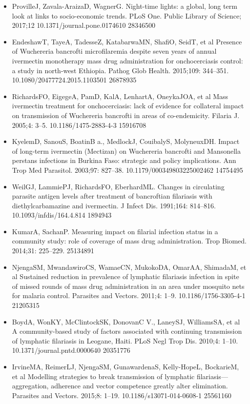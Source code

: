 \documentclass[11pt,a4paper]{article}
\begin{document}
\begin{itemize}
\item ProvilleJ, Zavala-AraizaD, WagnerG. Night-time lights: a global, long term look at links to socio-economic trends. PLoS One. Public Library of Science; 2017;12 10.1371/journal.pone.0174610 28346500
\item EndeshawT, TayeA, TadesseZ, KatabarwaMN, ShafiO, SeidT, et al Presence of Wuchereria bancrofti microfilaremia despite seven years of annual ivermectin monotherapy mass drug administration for onchocerciasis control: a study in north-west Ethiopia. Pathog Glob Health. 2015;109: 344–351. 10.1080/20477724.2015.1103501 26878935
\item RichardsFO, EigegeA, PamD, KalA, LenhartA, OneykaJOA, et al Mass ivermectin treatment for onchocerciasis: lack of evidence for collateral impact on transmission of Wuchereria bancrofti in areas of co-endemicity. Filaria J. 2005;4: 3–5. 10.1186/1475-2883-4-3 15916708
\item KyelemD, SanouS, BoatinB a., MedlockJ, CouibalyS, MolyneuxDH. Impact of long-term ivermectin (Mectizan) on Wuchereria bancrofti and Mansonella perstans infections in Burkina Faso: strategic and policy implications. Ann Trop Med Parasitol. 2003;97: 827–38. 10.1179/000349803225002462 14754495
\item WeilGJ, LammiePJ, RichardsFO, EberhardML. Changes in circulating parasite antigen levels after treatment of bancroftian filariasis with diethylcarbamazine and ivermectin. J Infect Dis. 1991;164: 814–816. 10.1093/infdis/164.4.814 1894943
\item KumarA, SachanP. Measuring impact on filarial infection status in a community study: role of coverage of mass drug administration. Trop Biomed. 2014;31: 225–229. 25134891
\item NjengaSM, MwandawiroCS, WamaeCN, MukokoDA, OmarAA, ShimadaM, et al Sustained reduction in prevalence of lymphatic filariasis infection in spite of missed rounds of mass drug administration in an area under mosquito nets for malaria control. Parasites and Vectors. 2011;4: 1–9. 10.1186/1756-3305-4-1 21205315
\item BoydA, WonKY, McClintockSK, DonovanC V., LaneySJ, WilliamsSA, et al A community-based study of factors associated with continuing transmission of lymphatic filariasis in Leogane, Haiti. PLoS Negl Trop Dis. 2010;4: 1–10. 10.1371/journal.pntd.0000640 20351776
\item IrvineMA, ReimerLJ, NjengaSM, GunawardenaS, Kelly-HopeL, BockarieM, et al Modelling strategies to break transmission of lymphatic filariasis—aggregation, adherence and vector competence greatly alter elimination. Parasites and Vectors. 2015;8: 1–19. 10.1186/s13071-014-0608-1 25561160

\end{itemize}
\end{document}
